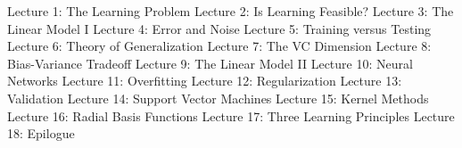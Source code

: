 Lecture 1: The Learning Problem
Lecture 2: Is Learning Feasible?
Lecture 3: The Linear Model I
Lecture 4: Error and Noise
Lecture 5: Training versus Testing
Lecture 6: Theory of Generalization
Lecture 7: The VC Dimension
Lecture 8: Bias-Variance Tradeoff
Lecture 9: The Linear Model II
Lecture 10: Neural Networks
Lecture 11: Overfitting
Lecture 12: Regularization
Lecture 13: Validation
Lecture 14: Support Vector Machines
Lecture 15: Kernel Methods
Lecture 16: Radial Basis Functions
Lecture 17: Three Learning Principles
Lecture 18: Epilogue
